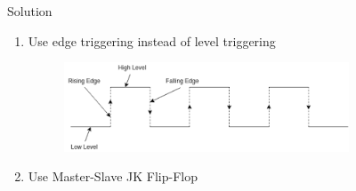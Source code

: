 \begin{frame}{Solution}
    \begin{enumerate}
        \item Use edge triggering instead of level triggering
        \break
        \begin{figure}
            \centering
            \includegraphics[width=0.8\textwidth]{download.png}
            \label{fig:my_label}
        \end{figure}
        \pause
        \item Use Master-Slave JK Flip-Flop
    \end{enumerate}
\end{frame}